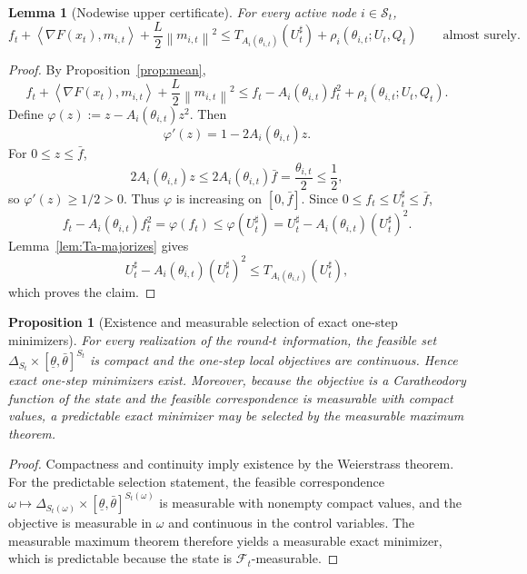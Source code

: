 \documentclass{article}
\newtheorem{lemma}[theorem]{Lemma}
\newtheorem{proposition}[theorem]{Proposition}
\theoremstyle{definition}
\newcommand{\cF}{\mathcal F}
\newcommand{\norm}[1]{\left\lVert #1\right\rVert}
\newcommand{\ip}[2]{\left\langle #1,#2\right\rangle}
\begin{document}
\begin{lemma}[Nodewise upper certificate]
\label{lem:node-cert}
For every active node $i\in\mathcal S_t$,
\[
f_t
+
\ip{\nabla F(x_t)}{m_{i,t}}
+
\frac{L}{2}\norm{m_{i,t}}^2
\le
T_{A_i(\theta_{i,t})}(U_t^\sharp)
+
\rho_i(\theta_{i,t};U_t,Q_t)
\qquad\text{almost surely.}
\]
\end{lemma}

\begin{proof}
By Proposition~\ref{prop:mean},
\[
f_t
+
\ip{\nabla F(x_t)}{m_{i,t}}
+
\frac{L}{2}\norm{m_{i,t}}^2
\le
f_t-A_i(\theta_{i,t})f_t^2+\rho_i(\theta_{i,t};U_t,Q_t).
\]
Define $\varphi(z):=z-A_i(\theta_{i,t})z^2$. Then
\[
\varphi'(z)=1-2A_i(\theta_{i,t})z.
\]
For $0\le z\le \bar f$,
\[
2A_i(\theta_{i,t})z
\le
2A_i(\theta_{i,t})\bar f
=
\frac{\theta_{i,t}}{2}\le \frac12,
\]
so $\varphi'(z)\ge 1/2>0$. Thus $\varphi$ is increasing on $[0,\bar f]$. Since
$0\le f_t\le U_t^\sharp\le \bar f$,
\[
f_t-A_i(\theta_{i,t})f_t^2
=\varphi(f_t)
\le \varphi(U_t^\sharp)
=U_t^\sharp-A_i(\theta_{i,t})(U_t^\sharp)^2.
\]
Lemma~\ref{lem:Ta-majorizes} gives
\[
U_t^\sharp-A_i(\theta_{i,t})(U_t^\sharp)^2
\le
T_{A_i(\theta_{i,t})}(U_t^\sharp),
\]
which proves the claim.
\end{proof}

\begin{proposition}[Existence and measurable selection of exact one-step minimizers]
\label{prop:existence}
For every realization of the round-$t$ information, the feasible set
$\Delta_{S_t}\times[\underline\theta,\bar\theta]^{S_t}$ is compact and the
one-step local objectives are continuous. Hence exact one-step minimizers
exist. Moreover, because the objective is a Caratheodory function of the state
and the feasible correspondence is measurable with compact values, a predictable
exact minimizer may be selected by the measurable maximum theorem.
\end{proposition}

\begin{proof}
Compactness and continuity imply existence by the Weierstrass theorem. For the
predictable selection statement, the feasible correspondence
$\omega\mapsto \Delta_{S_t(\omega)}\times[\underline\theta,\bar\theta]^{S_t(\omega)}$
is measurable with nonempty compact values, and the objective is measurable in
$\omega$ and continuous in the control variables. The measurable maximum theorem
therefore yields a measurable exact minimizer, which is predictable because the
state is $\cF_t$-measurable.
\end{proof}
\end{document}
